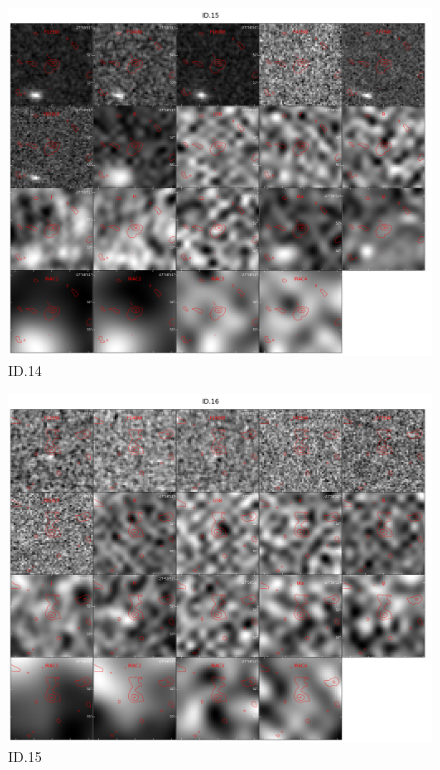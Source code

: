 \begin{figure}[tbp]
\centering \includegraphics[width=120mm]{Matched/ASPECS_Cutout_14.jpg}
\caption{ID.14}
\label{fig:Match_Three}
\end{figure}

\begin{figure}[tbp]
\centering \includegraphics[width=120mm]{Matched/ASPECS_Cutout_15.jpg}
\caption{ID.15}
\label{fig:Match_Three}
\end{figure}

